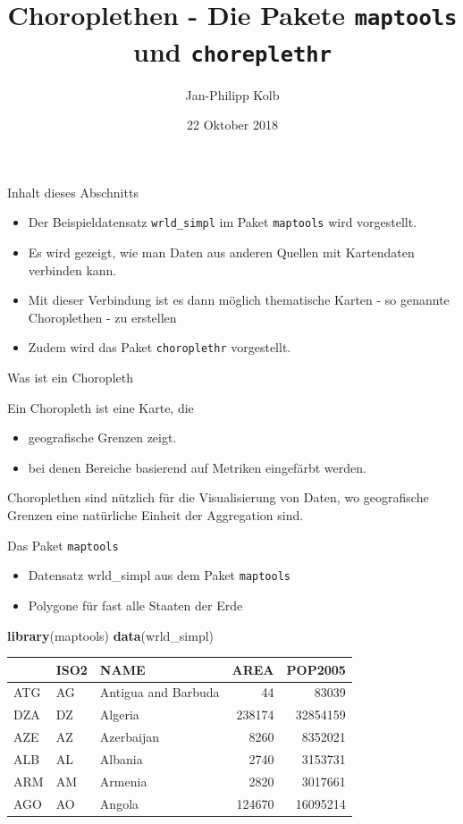 \documentclass[ignorenonframetext,]{beamer}
\title{Choroplethen - Die Pakete \texttt{maptools} und \texttt{choreplethr}}
\author{Jan-Philipp Kolb}
\date{22 Oktober 2018}
\newenvironment{Shaded}{\begin{snugshade}}{\end{snugshade}}
\newcommand{\KeywordTok}[1]{\textcolor[rgb]{0.13,0.29,0.53}{\textbf{#1}}}
\newcommand{\NormalTok}[1]{#1}
\providecommand{\tightlist}{%
  \setlength{\itemsep}{0pt}\setlength{\parskip}{0pt}}
\begin{document}
\frame{\titlepage}

\begin{frame}[fragile]{Inhalt dieses Abschnitts}

\begin{itemize}
\tightlist
\item
  Der Beispieldatensatz \texttt{wrld\_simpl} im Paket \texttt{maptools}
  wird vorgestellt.
\item
  Es wird gezeigt, wie man Daten aus anderen Quellen mit Kartendaten
  verbinden kann.
\item
  Mit dieser Verbindung ist es dann möglich thematische Karten - so
  genannte Choroplethen - zu erstellen
\item
  Zudem wird das Paket \texttt{choroplethr} vorgestellt.
\end{itemize}

\end{frame}

\begin{frame}{Was ist ein Choropleth}

Ein Choropleth ist eine Karte, die

\begin{itemize}
\tightlist
\item
  geografische Grenzen zeigt.
\item
  bei denen Bereiche basierend auf Metriken eingefärbt werden.
\end{itemize}

Choroplethen sind nützlich für die Visualisierung von Daten, wo
geografische Grenzen eine natürliche Einheit der Aggregation sind.

\end{frame}

\begin{frame}[fragile]{Das Paket \texttt{maptools}}

\begin{itemize}
\tightlist
\item
  Datensatz wrld\_simpl aus dem Paket \texttt{maptools}
\item
  Polygone für fast alle Staaten der Erde
\end{itemize}

\begin{Shaded}
\begin{Highlighting}[]
\KeywordTok{library}\NormalTok{(maptools)}
\KeywordTok{data}\NormalTok{(wrld_simpl)}
\end{Highlighting}
\end{Shaded}

\begin{longtable}[]{@{}lllrr@{}}
\toprule
& ISO2 & NAME & AREA & POP2005\tabularnewline
\midrule
\endhead
ATG & AG & Antigua and Barbuda & 44 & 83039\tabularnewline
DZA & DZ & Algeria & 238174 & 32854159\tabularnewline
AZE & AZ & Azerbaijan & 8260 & 8352021\tabularnewline
ALB & AL & Albania & 2740 & 3153731\tabularnewline
ARM & AM & Armenia & 2820 & 3017661\tabularnewline
AGO & AO & Angola & 124670 & 16095214\tabularnewline
\bottomrule
\end{longtable}

\end{frame}
\end{document}
